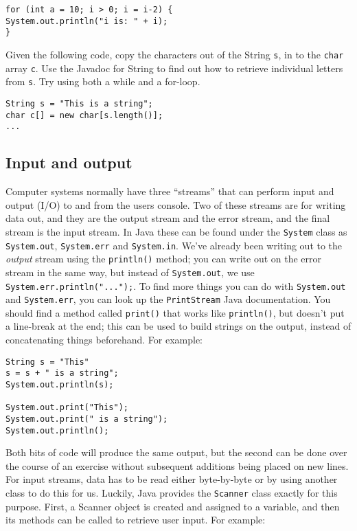 \begin{verbatim}
for (int a = 10; i > 0; i = i-2) {
System.out.println("i is: " + i);
}
\end{verbatim}

\noindent
Given the following code, copy the characters out of the String {\tt s}, in to the {\tt char} array {\tt c}. Use the Javadoc for String to find out how to retrieve individual letters from {\tt s}. Try using both a while and a for-loop.

\begin{verbatim}
String s = "This is a string";
char c[] = new char[s.length()];
...
\end{verbatim}

\subsection{Input and output}

Computer systems normally have three ``streams'' that can perform input and output (I/O) to and from the users console. Two of these streams are for writing data out, and they are the output stream and the error stream, and the final stream is the input stream. In Java these can be found under the {\tt System} class as {\tt System.out}, {\tt System.err} and {\tt System.in}. We've already been writing out to the \emph{output} stream using the {\tt println()} method; you can write out on the error stream in the same way, but instead of {\tt System.out}, we use {\tt System.err.println("...");}. To find more things you can do with {\tt System.out} and {\tt System.err}, you can look up the {\tt PrintStream} Java documentation. You should find a method called {\tt print()} that works like {\tt println()}, but doesn't put a line-break at the end; this can be used to build strings on the output, instead of concatenating things beforehand. For example:

\begin{verbatim}
String s = "This"
s = s + " is a string";
System.out.println(s);

System.out.print("This");
System.out.print(" is a string");
System.out.println();
\end{verbatim}

\noindent
Both bits of code will produce the same output, but the second can be done over the course of an exercise without subsequent additions being placed on new lines.\\

\noindent
For input streams, data has to be read either byte-by-byte or by using another class to do this for us. Luckily, Java provides the {\tt Scanner} class exactly for this purpose. First, a Scanner object is created and assigned to a variable, and then its methods can be called to retrieve user input. For example:

